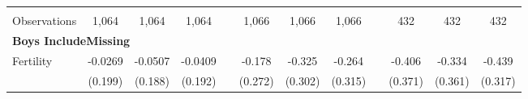 \begin{landscape}
\begin{table}[htpb!]
\begin{center}
\begin{tabular}{lcccp{2mm}cccp{2mm}ccc}
\begin{footnotesize}\end{footnotesize}&\begin{footnotesize}\end{footnotesize}&\begin{footnotesize}\end{footnotesize}&\begin{footnotesize}\end{footnotesize}&\begin{footnotesize}\end{footnotesize}&\begin{footnotesize}\end{footnotesize}&\begin{footnotesize}\end{footnotesize}&\begin{footnotesize}\end{footnotesize}&\begin{footnotesize}\end{footnotesize}&\begin{footnotesize}\end{footnotesize}&\begin{footnotesize}\end{footnotesize}&\begin{footnotesize}\end{footnotesize}\\Observations&1,064&1,064&1,064&&1,066&1,066&1,066&&432&432&432\\
\multicolumn{12}{l}{\textbf{Boys IncludeMissing}}\\ 
Fertility&-0.0269&-0.0507&-0.0409&&-0.178&-0.325&-0.264&&-0.406&-0.334&-0.439\\
&(0.199)&(0.188)&(0.192)&&(0.272)&(0.302)&(0.315)&&(0.371)&(0.361)&(0.317)\\

\end{tabular}
\end{center}
\end{table}
\end{landscape}
